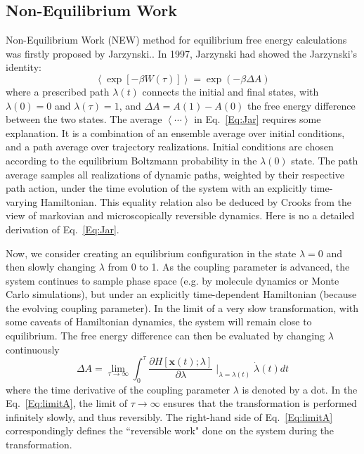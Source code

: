 \subsection{Non-Equilibrium Work\label{Sec:FEM:NEW}}
Non-Equilibrium Work (NEW) method for equilibrium free energy calculations was firstly proposed by Jarzynski.\cite{JarzynskiPRL1997}. 
In 1997, Jarzynski had showed the Jarzynski's identity:
\begin{equation}
\left \langle \exp[-\beta W(\tau)] \right \rangle = \exp(-\beta \Delta A) 
\label{Eq:Jar}
\end{equation} 
where a prescribed path $\lambda(t)$ connects the initial and final states, with $\lambda(0)=0$ and $\lambda(\tau)=1$, and $\Delta A = A(1) - A(0)$ the free energy difference between the two states. The average $\left \langle \cdots \right \rangle$ in Eq.~\ref{Eq:Jar} requires some explanation. It is a combination of an ensemble average over initial conditions, and a path average over trajectory realizations. Initial conditions are chosen according to the equilibrium Boltzmann probability in the $\lambda(0)$ state. The path average samples all realizations of dynamic paths, weighted by their respective path action, under the time evolution of the system with an explicitly time-varying Hamiltonian. This equality relation also be deduced by Crooks from the view of markovian and microscopically reversible dynamics.\cite{CrooksJSP1998} Here is no a detailed derivation of Eq.~\ref{Eq:Jar}.

Now, we consider creating an equilibrium configuration in the state $\lambda=0$ and then slowly changing $\lambda$ from 0 to 1. As the coupling parameter is advanced, the system continues to sample phase space (e.g. by molecule dynamics or Monte Carlo simulations), but under an explicitly time-dependent Hamiltonian (because the evolving coupling parameter). In the limit of a very slow transformation, with some caveats of Hamiltonian dynamics, the system will remain close to equilibrium. The free energy difference can then be evaluated by changing $\lambda$ continuously
\begin{equation}
\Delta A =\lim_{\tau\to\infty} \int_{0}^{\tau} \frac{\partial{H[\textbf{x}(t);\lambda]}}{\partial{\lambda}}\mid_ {\lambda=\lambda(t)} \dot{\lambda}(t) dt
\label{Eq:limitA}
\end{equation}  
where the time derivative of the coupling parameter $\lambda$ is denoted by a dot. In the Eq.~\ref{Eq:limitA}, the limit of $\tau\to\infty$ ensures that the transformation is performed infinitely slowly, and thus reversibly. The right-hand side of Eq.~\ref{Eq:limitA} correspondingly defines the ``reversible work" done on the system during the transformation.

